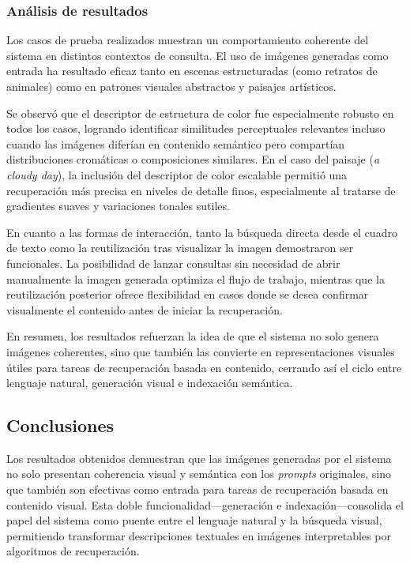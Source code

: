 \subsubsection{Análisis de resultados}

Los casos de prueba realizados muestran un comportamiento coherente del sistema en distintos contextos de consulta. El uso de imágenes generadas como entrada ha resultado eficaz tanto en escenas estructuradas (como retratos de animales) como en patrones visuales abstractos y paisajes artísticos.

Se observó que el descriptor de estructura de color fue especialmente robusto en todos los casos, logrando identificar similitudes perceptuales relevantes incluso cuando las imágenes diferían en contenido semántico pero compartían distribuciones cromáticas o composiciones similares. En el caso del paisaje (\textit{a cloudy day}), la inclusión del descriptor de color escalable permitió una recuperación más precisa en niveles de detalle finos, especialmente al tratarse de gradientes suaves y variaciones tonales sutiles.

En cuanto a las formas de interacción, tanto la búsqueda directa desde el cuadro de texto como la reutilización tras visualizar la imagen demostraron ser funcionales. La posibilidad de lanzar consultas sin necesidad de abrir manualmente la imagen generada optimiza el flujo de trabajo, mientras que la reutilización posterior ofrece flexibilidad en casos donde se desea confirmar visualmente el contenido antes de iniciar la recuperación.

En resumen, los resultados refuerzan la idea de que el sistema no solo genera imágenes coherentes, sino que también las convierte en representaciones visuales útiles para tareas de recuperación basada en contenido, cerrando así el ciclo entre lenguaje natural, generación visual e indexación semántica.

\subsection{Conclusiones}

Los resultados obtenidos demuestran que las imágenes generadas por el sistema no solo presentan coherencia visual y semántica con los \textit{prompts} originales, sino que también son efectivas como entrada para tareas de recuperación basada en contenido visual. Esta doble funcionalidad—generación e indexación—consolida el papel del sistema como puente entre el lenguaje natural y la búsqueda visual, permitiendo transformar descripciones textuales en imágenes interpretables por algoritmos de recuperación.

